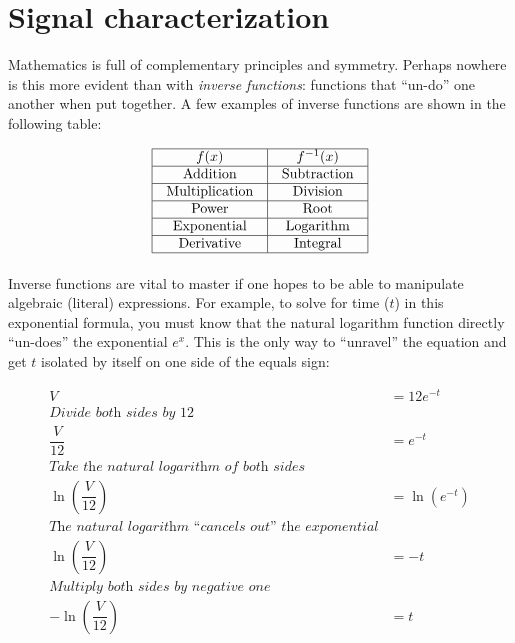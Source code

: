 \chapter{Signal characterization}

Mathematics is full of complementary principles and symmetry.  Perhaps nowhere is this more evident than with \textit{inverse functions}: functions that ``un-do'' one another when put together.  A few examples of inverse functions are shown in the following table:  


$$\vbox{\offinterlineskip
\halign{\strut
\vrule \quad\hfil # \ \hfil & 
\vrule \quad\hfil # \ \hfil \vrule \cr
\noalign{\hrule}
%
$f(x)$ & $f^{-1}(x)$ \cr
%
\noalign{\hrule}
%
Addition & Subtraction \cr
%
\noalign{\hrule}
%
Multiplication & Division \cr
%
\noalign{\hrule}
%
Power & Root \cr
%
\noalign{\hrule}
%
Exponential & Logarithm \cr
%
\noalign{\hrule}
%
Derivative & Integral \cr
%
\noalign{\hrule}
} %
}$$ %

Inverse functions are vital to master if one hopes to be able to manipulate algebraic (literal) expressions.  For example, to solve for time ($t$) in this exponential formula, you must know that the natural logarithm function directly ``un-does'' the exponential $e^x$.  This is the only way to ``unravel'' the equation and get $t$ isolated by itself on one side of the equals sign:

\begin{align*}
	V &= 12e^{-t}\\
\textit{Divide both sides by 12}\\
	\dfrac {V} {12} &= e^{-t}\\
	\textit{Take the natural logarithm of both sides}\\
	\ln \left(\dfrac {V}  {12}\right) &= \ln \left(e^{-t}\right)\\
\textit{The natural logarithm ``cancels out'' the exponential}\\
	\ln \left(\dfrac{V} {12}\right) &= -t\\
\textit{Multiply both sides by negative one}\\
	- \ln \left(\dfrac{V}{12}\right) &= t\\
\end{align*}




